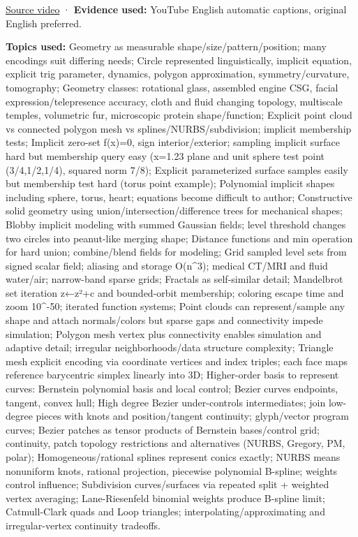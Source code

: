 \href{https://www.youtube.com/watch?v=MakhXtIX2YM}{Source video} · \textbf{Evidence used:} YouTube English automatic captions, original English preferred.

\textbf{Topics used:} Geometry as measurable shape/size/pattern/position; many encodings suit differing needs; Circle represented linguistically, implicit equation, explicit trig parameter, dynamics, polygon approximation, symmetry/curvature, tomography; Geometry classes: rotational glass, assembled engine CSG, facial expression/telepresence accuracy, cloth and fluid changing topology, multiscale temples, volumetric fur, microscopic protein shape/function; Explicit point cloud vs connected polygon mesh vs splines/NURBS/subdivision; implicit membership tests; Implicit zero-set f(x)=0, sign interior/exterior; sampling implicit surface hard but membership query easy (x=1.23 plane and unit sphere test point (3/4,1/2,1/4), squared norm 7/8); Explicit parameterized surface samples easily but membership test hard (torus point example); Polynomial implicit shapes including sphere, torus, heart; equations become difficult to author; Constructive solid geometry using union/intersection/difference trees for mechanical shapes; Blobby implicit modeling with summed Gaussian fields; level threshold changes two circles into peanut-like merging shape; Distance functions and min operation for hard union; combine/blend fields for modeling; Grid sampled level sets from signed scalar field; aliasing and storage O(n\^{}3); medical CT/MRI and fluid water/air; narrow-band sparse grids; Fractals as self-similar detail; Mandelbrot set iteration z←z²+c and bounded-orbit membership; coloring escape time and zoom 10\^{}-50; iterated function systems; Point clouds can represent/sample any shape and attach normals/colors but sparse gaps and connectivity impede simulation; Polygon mesh vertex plus connectivity enables simulation and adaptive detail; irregular neighborhoods/data structure complexity; Triangle mesh explicit encoding via coordinate vertices and index triples; each face maps reference barycentric simplex linearly into 3D; Higher-order basis to represent curves: Bernstein polynomial basis and local control; Bezier curves endpoints, tangent, convex hull; High degree Bezier under-controls intermediates; join low-degree pieces with knots and position/tangent continuity; glyph/vector program curves; Bezier patches as tensor products of Bernstein bases/control grid; continuity, patch topology restrictions and alternatives (NURBS, Gregory, PM, polar); Homogeneous/rational splines represent conics exactly; NURBS means nonuniform knots, rational projection, piecewise polynomial B-spline; weights control influence; Subdivision curves/surfaces via repeated split + weighted vertex averaging; Lane-Riesenfeld binomial weights produce B-spline limit; Catmull-Clark quads and Loop triangles; interpolating/approximating and irregular-vertex continuity tradeoffs.

